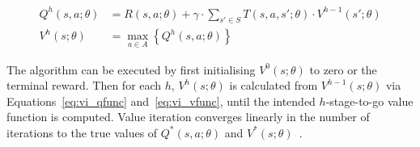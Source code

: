 {\footnotesize 
    \abovedisplayskip=0pt
    \belowdisplayskip=0pt
    \begin{align}
        Q^{h}(s, a; \theta) &= R(s, a; \theta) + \gamma \cdot \sum_{s' \in S} T(s, a, s'; \theta) \cdot V^{h-1}(s'; \theta) \label{eq:vi_qfunc}\\
        V^{h}(s; \theta) &= \max_{a \in A} \left\{ Q^{h}(s, a; \theta) \right\} \label{eq:vi_vfunc}
    \end{align}
}%

The algorithm can be executed by first initialising {\footnotesize $V^{0}(s; \theta)$}  to zero or the terminal reward. Then for each $h$, {\footnotesize $V^{h}(s; \theta)$} is calculated from {\footnotesize $V^{h-1}(s; \theta)$} via Equations~\eqref{eq:vi_qfunc} and~\eqref{eq:vi_vfunc}, until the intended  $h$-stage-to-go value function is computed. Value iteration converges linearly in the number of iterations to the true values of {\footnotesize $Q^{*}(s, a; \theta)$} and {\footnotesize $V^{*}(s; \theta)$}~\parencite{Bertsekas_1987}.